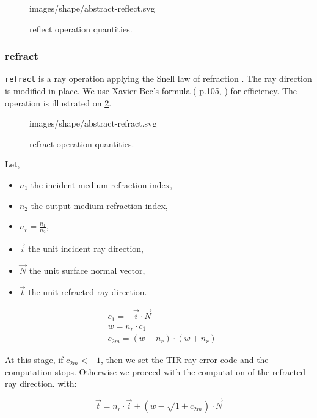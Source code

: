 \begin{figure} \caption{\label{fig:reflect} reflect operation quantities.}

           {images/shape/abstract-reflect.svg}
\end{figure}

\subsubsection{refract}
\lstinline{refract} is a ray operation applying the Snell law of refraction
\cite{wiki:snell-refraction}. The ray direction is modified in place.  We use
Xavier Bec's formula (\cite{Marrs:2021} p.105, \cite{Bec:1997}) for efficiency.
The operation is illustrated on \cref{fig:refract}.

\begin{figure} \caption{\label{fig:refract} refract operation quantities.}

           {images/shape/abstract-refract.svg}
\end{figure}

Let,

\begin{itemize}
\item $n_1$ the incident medium refraction index,
\item $n_2$ the output medium refraction index,
\item $n_r = \frac{n_1}{n_2}$,
\item $\overrightarrow{i}$ the unit incident ray direction,
\item $\overrightarrow{N}$ the unit surface normal vector,
\item $\overrightarrow{t}$ the unit refracted ray direction.
\end{itemize}

\begin{equation}
\begin{split}
&c_1 = - \overrightarrow{i} \cdot \overrightarrow{N} \\
&w = n_r \cdot c_1 \\
&c_{2m} = (w - n_r) \cdot (w + n_r)
\end{split} \end{equation}

At this stage, if $c_{2m} < -1$, then we set the \gls{TIR} ray
error code and the computation stops. Otherwise we proceed with
the computation of the refracted ray direction.
with:

\begin{equation} \label{eq:bec-formula}
\overrightarrow{t} = n_r \cdot \overrightarrow{i} +
(w - \sqrt{1 + c_{2m}}) \cdot \overrightarrow{N}
\end{equation}

